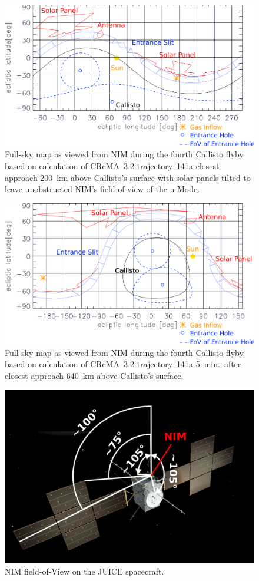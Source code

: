 	\begin{figure}[h!]
		\centering
		\includegraphics[width = .7\textwidth]{Bilder/NIM_pointing_2031JAN15195200.png}
		\caption{Full-sky map as viewed from NIM during the fourth Callisto flyby based on calculation of CReMA~3.2 trajectory~141a \cite{SOC_Crema3p2} closest approach 200~km above Callisto's surface with solar panels tilted to leave unobstructed NIM's field-of-view of the n-Mode.}
		\label{fig:FlybyCal1952}
	\end{figure}
	\begin{figure}[h!]
		\centering
		\includegraphics[width = .7\textwidth]{Bilder/NIM_pointing_2031JAN15195700.png}
		\caption{Full-sky map as viewed from NIM during the fourth Callisto flyby based on calculation of CReMA~3.2 trajectory~141a \cite{SOC_Crema3p2} 5~min.\ after closest approach 640~km above Callisto's surface.}
		\label{fig:FlybyCal1957}
	\end{figure}
	\begin{figure}[h!]
		\centering
		\includegraphics[width=.6\textwidth]{Bilder/SC_Angle.png}
		\caption{NIM field-of-View on the JUICE spacecraft.}
		\label{fig:SCFoV}
	\end{figure}
